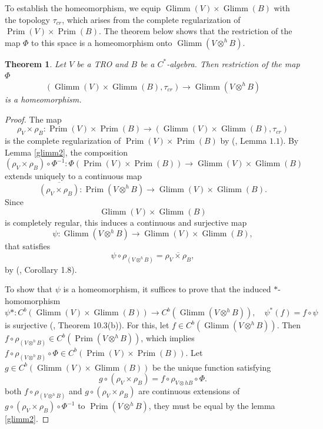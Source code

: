 \documentclass{birkjour}
\newtheorem{thm}{Theorem}[section]
\theoremstyle{definition}
\theoremstyle{remark}
\numberwithin{equation}{section}
\begin{document}
To establish the homeomorphism,  we equip \( \operatorname{Glimm}(V) \times \operatorname{Glimm}(B) \) with the topology $\tau_{cr}$, which arises from the complete regularization of \(\operatorname{Prim}(V) \times \operatorname{Prim}(B)\). The theorem below shows that the restriction of the map $\Phi$ to this space is a homeomorphism onto $\operatorname{Glimm}(V \otimes^h B)$.




\begin{thm}\label{sec6main}
    Let $V$ be a TRO and $B$ be a $C^{\ast}$-algebra. Then restriction of the map $\Phi$  $$(\operatorname{Glimm}(V) \times \operatorname{Glimm}(B), \tau_{cr}) \to \operatorname{Glimm}(V \otimes^h B)$$   is a homeomorphism. 
\end{thm}

\begin{proof}
The map  $$\rho_V \times \rho_B : \operatorname{Prim}(V) \times \operatorname{Prim}(B) \to (\operatorname{Glimm}(V) \times \operatorname{Glimm}(B), \tau_{cr})$$ is the complete regularization of \(\operatorname{Prim}(V) \times \operatorname{Prim}(B)\) by (\cite{Glimm}, Lemma $1.1$). By Lemma \ref{glimm2}, the composition  
\[
(\rho_V \times \rho_B) \circ \Phi^{-1} : \Phi(\operatorname{Prim}(V) \times \operatorname{Prim}(B)) \to \operatorname{Glimm}(V) \times \operatorname{Glimm}(B)
\]  
extends uniquely to a continuous map  
\[
\overline{(\rho_V \times \rho_B)} : \operatorname{Prim}(V\otimes^h B) \to \operatorname{Glimm}(V) \times \operatorname{Glimm}(B).
\]
Since \[\operatorname{Glimm}(V) \times \operatorname{Glimm}(B)\] is completely regular, this induces a continuous and surjective map \[ \psi : \operatorname{Glimm}(V\otimes^h B) \to \operatorname{Glimm}(V) \times \operatorname{Glimm}(B), \] that satisfies \[ \psi \circ \rho_{(V \otimes^h B)} = \overline{\rho_V \times \rho_B}, \]
by (\cite{walk}, Corollary 1.8).  


To show that \(\psi\) is a homeomorphism, it suffices to prove that the induced \(*\)-homomorphism \[ \psi *: C^b(\operatorname{Glimm}(V) \times \operatorname{Glimm}(B)) \to C^b(\operatorname{Glimm}(V \otimes^h B)), \quad \psi^*(f) = f \circ \psi
\]  
is surjective (\cite{rings}, Theorem 10.3(b)). For this, let \(f \in C^b(\operatorname{Glimm}(V\otimes^h B))\). Then $f \circ \rho_{(V \otimes^h B)} \in C^b(\operatorname{Prim}(V\otimes^h B))$, which implies  $ f \circ \rho_{(V \otimes^h B)} \circ \Phi \in C^b(\operatorname{Prim}(V) \times \operatorname{Prim}(B))$. 
Let \(g \in C^b(\operatorname{Glimm}(V) \times \operatorname{Glimm}(B))\) be the unique function satisfying 
\[g \circ (\rho_V \times \rho_B) = f \circ \rho _{V \otimes h B} \circ \Phi.\] 
both \(f \circ \rho_{(V \otimes^h B)}\) and \(g \circ (\rho_V \times \rho_B)\) are continuous extensions of \(g \circ (\rho_V \times \rho_B) \circ \Phi^{-1}\) to \(\operatorname{Prim}(V\otimes^h B)\), they must be equal by the lemma \ref{glimm2}.  


\end{proof}
\end{document}
